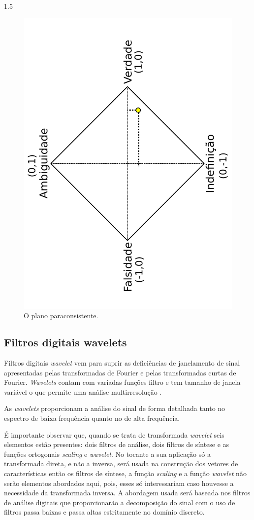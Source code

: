 \documentclass[a4paper,12pt,openright,oneside]{book}
\newenvironment{myenv}[1]
  {\begin{spacing}{#1}}
  {\end{spacing}}
\begin{document}
\begin{myenv}{1.5}
					\begin{figure}[h]
						\centering
						\includegraphics[width=0.69\linewidth]{images/paraconsistentPlane.pdf}
						\caption{O plano paraconsistente.}
						\label{fig:paraconsistentplane}
					\end{figure}

				\subsection{Filtros digitais wavelets}
					\par Filtros digitais \textit{wavelet} vem para suprir as deficiências de janelamento de sinal apresentadas pelas transformadas de Fourier e pelas transformadas curtas de Fourier. \textit{Wavelets} contam com variadas funções filtro e tem tamanho de janela variável o que permite uma análise multirresolução \cite{Rod5254905}.
					
					\par As \textit{wavelets} proporcionam a análise do sinal de forma detalhada tanto no espectro de baixa frequência quanto no de alta frequência.
					
					\par É importante observar que, quando se trata de transformada \textit{wavelet} seis elementos estão presentes: dois filtros de análise, dois filtros de síntese e as funções ortogonais \textit{scaling} e \textit{wavelet}. No tocante a sua aplicação só a transformada direta, e não a inversa, será usada na construção dos vetores de características então os filtros de síntese, a função \textit{scaling} e a função \textit{wavelet} não serão elementos abordados aqui, pois, esses só interessariam caso houvesse a necessidade da transformada inversa. A abordagem usada será baseada nos filtros de análise digitais que proporcionarão a decomposição do sinal com o uso de filtros passa baixas e passa altas estritamente no domínio discreto.
		

\end{myenv}
\end{document}
